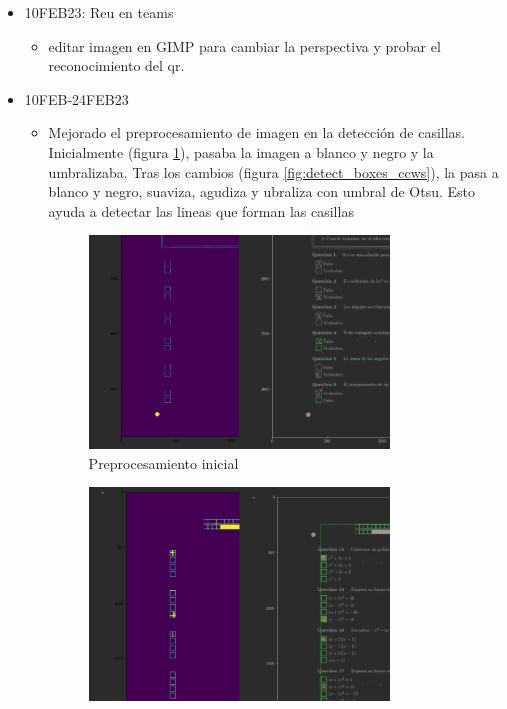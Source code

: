 \begin{itemize}
\begin{itemize}
\begin{itemize}
            \item Generado un \href{https://github.com/andrsvb/tfg2/blob/e12eb83407ad1875bf4b1cf99487589d2a4c55a8/test%20casillas%20marcadas/test_qr.tex}{fichero \LaTeX} que genera un examen de tres páginas con veinte preguntas de opción múltiple
        \end{itemize}
    \end{itemize}
    \item 10FEB23: Reu en teams
    \begin{itemize}
        \item editar imagen en GIMP para cambiar la perspectiva y probar el reconocimiento del qr.
    \end{itemize}
    \item 10FEB-24FEB23
    \begin{itemize}
        \item Mejorado el preprocesamiento de imagen en la detección de casillas. Inicialmente (figura \ref{fig:detect_boxes_old}), pasaba la imagen a blanco y negro y la umbralizaba. Tras los cambios (figura \ref{fig:detect_boxes_ccws}), la pasa a blanco y negro, suaviza, agudiza y ubraliza con umbral de Otsu. Esto ayuda a detectar las lineas que forman las casillas
        \begin{figure}
            \centering
            \includegraphics[width=0.8\textwidth]{figures/detect_boxes_old.png}
            \caption{Preprocesamiento inicial}
            \label{fig:detect_boxes_old}
        \end{figure}
        \begin{figure}
            \centering
            \includegraphics[width=0.8\textwidth]{figures/detect_boxes_ccws.png}

\end{figure}
\end{itemize}
\end{itemize}
